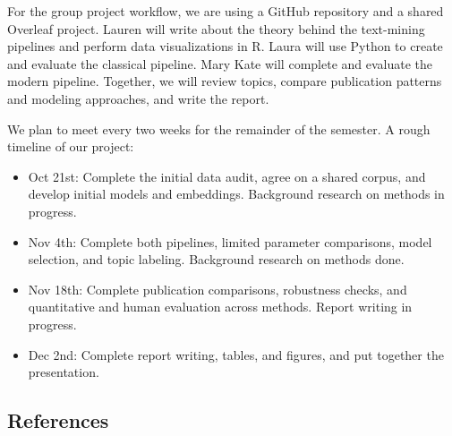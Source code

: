 \documentclass{article}
\begin{document}
For the group project workflow, we are using a GitHub repository and a shared Overleaf project. Lauren will write about the theory behind the text-mining pipelines and perform data visualizations in R. Laura will use Python to create and evaluate the classical pipeline. Mary Kate will complete and evaluate the modern pipeline. Together, we will review topics, compare publication patterns and modeling approaches, and write the report.

We plan to meet every two weeks for the remainder of the semester. A rough timeline of our project:
\begin{itemize}

\item Oct 21st: Complete the initial data audit, agree on a shared corpus, and develop initial models and embeddings. Background research on methods in progress.

\item Nov 4th: Complete both pipelines, limited parameter comparisons, model selection, and topic labeling. Background research on methods done.

\item Nov 18th: Complete publication comparisons, robustness checks, and quantitative and human evaluation across methods. Report writing in progress.

\item Dec 2nd: Complete report writing, tables, and figures, and put together the presentation.

\end{itemize}

\newpage
\subsection*{References}
\printbibliography[heading=none]
\end{document}
